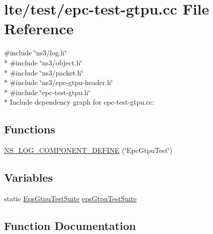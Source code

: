 \hypertarget{epc-test-gtpu_8cc}{}\section{lte/test/epc-\/test-\/gtpu.cc File Reference}
\label{epc-test-gtpu_8cc}
{\ttfamily \#include \char`\"{}ns3/log.\+h\char`\"{}}\\*
{\ttfamily \#include \char`\"{}ns3/object.\+h\char`\"{}}\\*
{\ttfamily \#include \char`\"{}ns3/packet.\+h\char`\"{}}\\*
{\ttfamily \#include \char`\"{}ns3/epc-\/gtpu-\/header.\+h\char`\"{}}\\*
{\ttfamily \#include \char`\"{}epc-\/test-\/gtpu.\+h\char`\"{}}\\*
Include dependency graph for epc-\/test-\/gtpu.cc\+:
\subsection*{Functions}
\begin{DoxyCompactItemize}
\item 
\hyperlink{epc-test-gtpu_8cc_a228ee087832af8f71985b2ae5320072f}{N\+S\+\_\+\+L\+O\+G\+\_\+\+C\+O\+M\+P\+O\+N\+E\+N\+T\+\_\+\+D\+E\+F\+I\+NE} (\char`\"{}Epc\+Gtpu\+Test\char`\"{})
\end{DoxyCompactItemize}
\subsection*{Variables}
\begin{DoxyCompactItemize}
\item 
static \hyperlink{classEpsGtpuTestSuite}{Eps\+Gtpu\+Test\+Suite} \hyperlink{epc-test-gtpu_8cc_a14b8f933fb39684d82cc8e733f1b8750}{eps\+Gtpu\+Test\+Suite}
\end{DoxyCompactItemize}


\subsection{Function Documentation}
